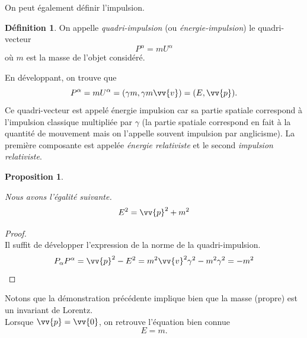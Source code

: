 \documentclass[a4paper,11pt]{report}
\theoremstyle{definition}
\theoremstyle{plain}
\newtheorem{prop}[thm]{Proposition}
\theoremstyle{definition}
\newtheorem{defn}{Définition}[chapter]
\theoremstyle{remark}
\begin{document}
            On peut également définir l'impulsion.
            \begin{defn}
                On appelle \textit{quadri-impulsion} (ou \textit{énergie-impulsion}) le quadri-vecteur 
                \begin{equation}
                    P^\alpha = mU^\alpha
                \end{equation}
                où $m$ est la masse de l'objet considéré.
            \end{defn}
            En développant, on trouve que
            \begin{equation}
                P^\alpha = m U^\alpha = (\gamma m,\gamma m\vv{v}) = (E,\vv{p}).
            \end{equation}
            Ce quadri-vecteur est appelé énergie impulsion car sa partie spatiale correspond à l'impulsion classique multipliée par $\gamma$ (la partie spatiale correspond en fait à la quantité de mouvement mais on l'appelle souvent impulsion par anglicisme). La première composante est appelée \textit{énergie relativiste} et le second \textit{impulsion relativiste}.
            
            \begin{prop}\begin{leftbar}
                Nous avons l'égalité suivante.
                \begin{equation}
                    E^2 = \vv{p}^2 + m^2
                \end{equation}
            \end{leftbar}\end{prop}
            \begin{proof}
            ${}$\\
                Il suffit de développer l'expression de la norme de la quadri-impulsion.
                \begin{equation}
                P_\alpha P^\alpha = \vv{p}^2-E^2 = m^2\vv{v}^2\gamma^2-m^2\gamma^2 = -m^2
            \end{equation}
            \end{proof}
            
            Notons que la démonstration précédente implique bien que la masse (propre) est un invariant de Lorentz.\\
            
            Lorsque $\vv{p} = \vv{0}$, on retrouve l'équation bien connue
            \begin{equation}
                E = m.
            \end{equation}
            
\end{document}
